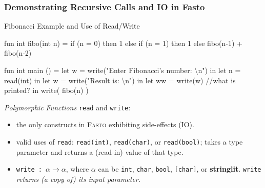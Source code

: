 \documentclass{beamer}
\newcommand{\emp}[1]{\textcolor{DikuRed}{ #1}}
\newcommand{\emphh}[1]{\textcolor{CosGreen}{ #1}}
\begin{document}
\begin{frame}[fragile,t]
\frametitle{Demonstrating Recursive Calls and IO in Fasto}

\begin{block}{Fibonacci Example and Use of Read/Write}
\begin{colorcode}
fun \emphh{int fibo(int n)} = if        (n = 0) then 1
                        else if (n = 1) then 1
                        else \emphh{fibo(n-1)} + \emphh{fibo(n-2)}

fun int main () = let w = \emp{write}("Enter Fibonacci's number: \textbackslash n")
                  in  let n = \emp{read(int)}
                      in let w = \emp{write}("Result is: \textbackslash n")
                         in let ww = \emp{write}(w)  //what is printed?
                             in \emp{write}( \emphh{fibo(n)} )
\end{colorcode} 
\end{block}

\pause

{\em Polymorphic Functions} {\tt read} and {\tt write}:\smallskip
\begin{itemize}
    \item the only constructs in \textsc{Fasto} exhibiting side-effects (IO).\smallskip
    \item valid uses of {\tt read}: {\tt read(int)}, {\tt read(char)},
            or {\tt read(bool)};
          takes a type parameter and returns a (read-in) value of that type.\smallskip
    \item {\tt write : }$\alpha \rightarrow \alpha$, where $\alpha$ can be 
            {\tt int}, {\tt char}, {\tt bool}, {\tt [char]}, or {\bf stringlit}.
            \emp{{\tt write} {\em returns (a copy of) its input parameter.}}
\end{itemize}

\end{frame}
\end{document}
